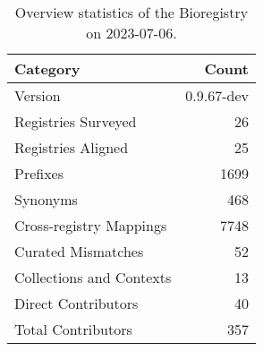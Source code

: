 \begin{table}
\caption{Overview statistics of the Bioregistry on 2023-07-06.}
\label{tab:bioregistry-summary}
\begin{tabular}{lr}
\toprule
Category & Count \\
\midrule
Version & 0.9.67-dev \\
Registries Surveyed & 26 \\
Registries Aligned & 25 \\
Prefixes & 1699 \\
Synonyms & 468 \\
Cross-registry Mappings & 7748 \\
Curated Mismatches & 52 \\
Collections and Contexts & 13 \\
Direct Contributors & 40 \\
Total Contributors & 357 \\
\bottomrule
\end{tabular}
\end{table}
